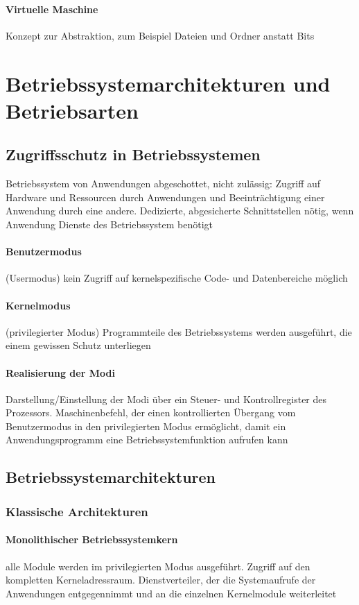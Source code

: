 \documentclass[10pt,a4paper,landscape]{article}
\begin{document}
\begin{multicols*}{3}
	\paragraph{Virtuelle Maschine} Konzept zur Abstraktion, zum Beispiel Dateien und Ordner anstatt Bits
	\section{Betriebssystemarchitekturen und Betriebsarten}
	\subsection{Zugriffsschutz in Betriebssystemen}
	Betriebssystem von Anwendungen abgeschottet, nicht zulässig: Zugriff auf Hardware und Ressourcen durch Anwendungen und Beeinträchtigung einer Anwendung durch eine andere. Dedizierte, abgesicherte Schnittstellen nötig, wenn Anwendung Dienste des Betriebssystem benötigt
	\paragraph{Benutzermodus} (Usermodus) kein Zugriff auf kernelspezifische Code- und Datenbereiche möglich
	\paragraph{Kernelmodus} (privilegierter Modus) Programmteile des Betriebssystems werden ausgeführt, die einem gewissen Schutz unterliegen
	\paragraph{Realisierung der Modi} Darstellung/Einstellung der Modi über ein Steuer- und Kontrollregister des Prozessors. Maschinenbefehl, der einen kontrollierten Übergang vom Benutzermodus in den privilegierten Modus ermöglicht, damit ein Anwendungsprogramm eine Betriebssystemfunktion aufrufen kann
	\subsection{Betriebssystemarchitekturen}
	\subsubsection{Klassische Architekturen}
	\paragraph{Monolithischer Betriebssystemkern} alle Module werden im privilegierten Modus ausgeführt. Zugriff auf den kompletten Kerneladressraum. Dienstverteiler, der die Systemaufrufe der Anwendungen entgegennimmt und an die einzelnen Kernelmodule weiterleitet

\end{multicols*}
\end{document}
